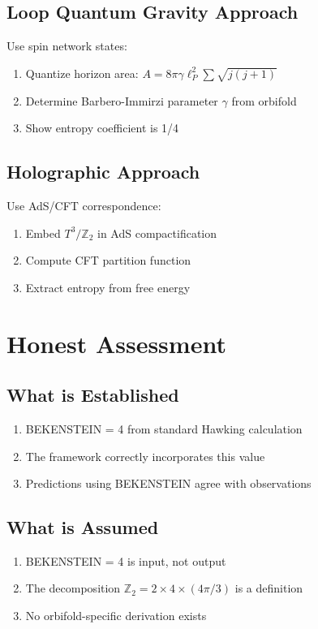 \documentclass[12pt,a4paper]{article}
\begin{document}
\subsection{Loop Quantum Gravity Approach}

Use spin network states:
\begin{enumerate}
    \item Quantize horizon area: $A = 8\pi\gamma \ell_P^2 \sum \sqrt{j(j+1)}$
    \item Determine Barbero-Immirzi parameter $\gamma$ from orbifold
    \item Show entropy coefficient is 1/4
\end{enumerate}

\subsection{Holographic Approach}

Use AdS/CFT correspondence:
\begin{enumerate}
    \item Embed $T^3/\mathbb{Z}_2$ in AdS compactification
    \item Compute CFT partition function
    \item Extract entropy from free energy
\end{enumerate}

\section{Honest Assessment}

\subsection{What is Established}

\begin{enumerate}
    \item BEKENSTEIN = 4 from standard Hawking calculation
    \item The framework correctly incorporates this value
    \item Predictions using BEKENSTEIN agree with observations
\end{enumerate}

\subsection{What is Assumed}

\begin{enumerate}
    \item BEKENSTEIN = 4 is input, not output
    \item The decomposition $\mathbb{Z}_2 = 2 \times 4 \times (4\pi/3)$ is a definition
    \item No orbifold-specific derivation exists
\end{enumerate}
\end{document}
